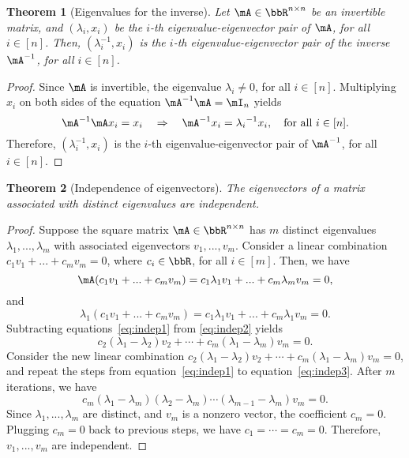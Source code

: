 \documentclass[11pt]{article}
\theoremstyle{plain}
\newtheorem{thm}{Theorem}[section]
\theoremstyle{definition}
\begin{document}
\begin{thm}[Eigenvalues for the inverse]
Let $\mA \in \bbR^{n \times n}$ be an invertible matrix, and $(\lambda_i, x_i)$ be the $i$-th eigenvalue-eigenvector pair of $\mA$, for all $i \in [n]$. Then, $(\lambda^{-1}_i, x_i)$ is the $i$-th eigenvalue-eigenvector pair of the inverse $\mA^{-1}$, for all $i \in [n]$.
\end{thm}

\begin{proof}
	Since $\mA$ is invertible, the eigenvalue $\lambda_i \neq 0$, for all $  i \in [n]$. Multiplying $x_i$ on both sides of the equation $\mA^{-1} \mA = \mI_n$ yields
	\[ \mA^{-1} \mA x_i = x_i \quad \Rightarrow\quad  \mA^{-1} x_i = {\lambda_i}^{-1} x_i, \quad \text{for all } i \in [n]. \]
Therefore, $(\lambda_i^{-1},x_i)$ is the $i$-th eigenvalue-eigenvector pair of $\mA^{-1}$, for all $i \in [n]$.
\end{proof}

\begin{thm}[Independence of eigenvectors]\label{thm:indepeigen} 
 The eigenvectors of a matrix associated with distinct eigenvalues are independent.
\end{thm}

\begin{proof}
	Suppose the square matrix $\mA \in \bbR^{n \times n}$ has $m$ distinct eigenvalues $\lambda_1,...,\lambda_m$ with associated eigenvectors  $v_1,...,v_m$. Consider a linear combination $c_1 v_1 + ... + c_m v_m = 0$, where $c_i \in \bbR$, for all $i \in [m]$.	
	Then, we have
	\begin{equation}\label{eq:indep1}
		\mA(c_1 v_1 + ... + c_m v_m ) = c_1 \lambda_1 v_1 + ... + c_m \lambda_m v_m = 0,
		\end{equation}
		and
		\begin{equation}\label{eq:indep2}
		\lambda_1 (c_1 v_1 + ... + c_m v_m ) = c_1 \lambda_1 v_1 + ... + c_m \lambda_1 v_m = 0. 
	\end{equation}
	Subtracting equations~\eqref{eq:indep1} from \eqref{eq:indep2} yields
	\begin{equation}\label{eq:indep3}
		 c_2 (\lambda_1 - \lambda_2) v_2 + \cdots + c_m (\lambda_1 - \lambda_m) v_m  = 0.
	\end{equation}
	Consider the new linear combination $ c_2 (\lambda_1 - \lambda_2) v_2 + \cdots + c_m (\lambda_1 - \lambda_m) v_m = 0$, and repeat the steps from equation~\eqref{eq:indep1} to equation~\eqref{eq:indep3}. After $m$ iterations, we have 
	\[ c_m(\lambda_1 - \lambda_m)(\lambda_2 - \lambda_m)\cdots (\lambda_{m-1} - \lambda_m) v_m = 0.    \]
	 Since $\lambda_1 ,..., \lambda_m$ are distinct, and $v_m$ is a nonzero vector, the coefficient $c_m = 0$.  Plugging $c_m = 0$ back to previous steps, we have $c_1 = \cdots = c_m = 0$. Therefore, $v_1,...,v_m$ are independent.
\end{proof}
\end{document}
